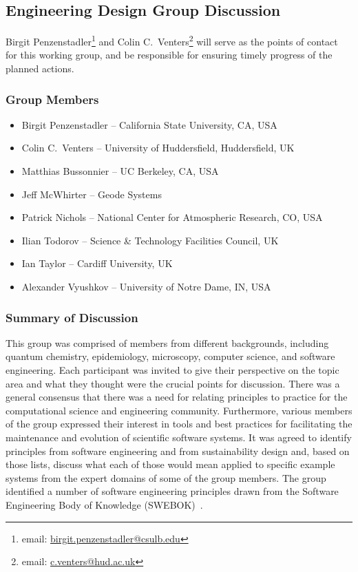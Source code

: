 \subsection{Engineering Design Group Discussion}
\label{sec:appendix_eng_design}

Birgit Penzenstadler\footnote{email:
\href{mailto:birgit.penzenstadler@csulb.edu}{birgit.penzenstadler@csulb.edu}}
and Colin C.\ Venters\footnote{email:
\href{mailto:c.venters@hud.ac.uk}{c.venters@hud.ac.uk}} will serve as the points
of contact for this working group, and be responsible for ensuring timely
progress of the planned actions.

\subsubsection{Group Members}

\begin{itemize}
\item Birgit Penzenstadler -- California State University, CA, USA
\item Colin C.\ Venters -- University of Huddersfield, Huddersfield, UK
\item Matthias Bussonnier -- UC Berkeley, CA, USA
\item Jeff McWhirter -- Geode Systems 
\item Patrick Nichols -- National Center for Atmospheric Research, CO, USA
\item Ilian Todorov -- Science \& Technology Facilities Council, UK
\item Ian Taylor -- Cardiff University, UK
\item Alexander Vyushkov -- University of Notre Dame, IN, USA
\end{itemize}

\subsubsection{Summary of Discussion}

This group was comprised  of members from different backgrounds, including quantum
chemistry, epidemiology, microscopy, computer science, and software engineering.
Each participant was invited to give their perspective on the topic area and
what they thought were the crucial points for discussion. There was a general
consensus that there was a need for relating principles to practice for the
computational science and engineering community. Furthermore, various members of
the group expressed their interest in tools and best practices for facilitating
the maintenance and evolution of scientific software systems. It was agreed to
identify principles from software engineering and from sustainability design
and, based on those lists, discuss what each of those would mean applied to
specific example systems from the expert domains of some of the group members.
The group identified a number of software engineering principles drawn from the
Software Engineering Body of Knowledge (SWEBOK)~\cite{swebokv3}.


